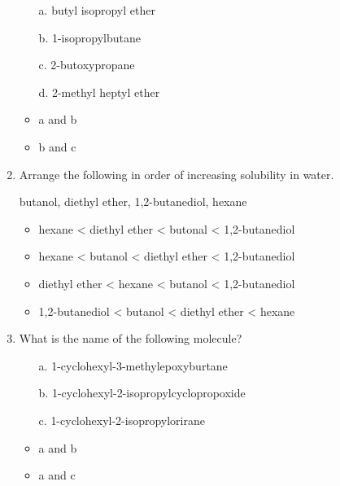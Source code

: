 \documentclass[12pt,a4paper]{article}
\begin{document}
\begin{enumerate}

    \begin{itemize}
        \item[a.] butyl isopropyl ether
        \item[b.] 1-isopropylbutane
        \item[c.] 2-butoxypropane
        \item[d.] 2-methyl heptyl ether
        \item {\color{o-Sun}a and b}
        \item b and c
    \end{itemize}
    \item Arrange the following in order of increasing solubility in water.

    butanol, diethyl ether, 1,2-butanediol, hexane
    \begin{itemize}
        \item {\color{o-Sun}hexane < diethyl ether < butonal < 1,2-butanediol}
        \item hexane < butanol < diethyl ether < 1,2-butanediol
        \item diethyl ether < hexane < butanol < 1,2-butanediol
        \item 1,2-butanediol < butanol < diethyl ether < hexane
    \end{itemize}
    \item What is the name of the following molecule?


    \begin{itemize}
        \item[a.] 1-cyclohexyl-3-methylepoxyburtane
        \item[b.] 1-cyclohexyl-2-isopropylcyclopropoxide
        \item[c.] {\color{o-Sun}1-cyclohexyl-2-isopropylorirane}
        \item a and b
        \item a and c
    \end{itemize}
\end{enumerate}
\end{document}
